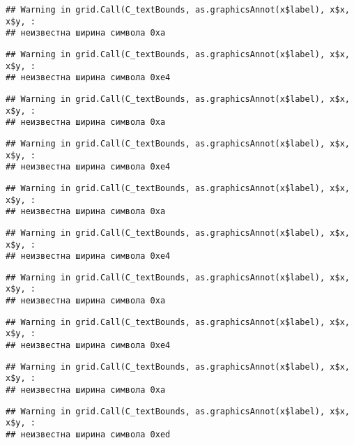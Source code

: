 \documentclass[
]{article}
\begin{document}
\begin{verbatim}
## Warning in grid.Call(C_textBounds, as.graphicsAnnot(x$label), x$x, x$y, :
## неизвестна ширина символа 0xa
\end{verbatim}

\begin{verbatim}
## Warning in grid.Call(C_textBounds, as.graphicsAnnot(x$label), x$x, x$y, :
## неизвестна ширина символа 0xe4
\end{verbatim}

\begin{verbatim}
## Warning in grid.Call(C_textBounds, as.graphicsAnnot(x$label), x$x, x$y, :
## неизвестна ширина символа 0xa
\end{verbatim}

\begin{verbatim}
## Warning in grid.Call(C_textBounds, as.graphicsAnnot(x$label), x$x, x$y, :
## неизвестна ширина символа 0xe4
\end{verbatim}

\begin{verbatim}
## Warning in grid.Call(C_textBounds, as.graphicsAnnot(x$label), x$x, x$y, :
## неизвестна ширина символа 0xa
\end{verbatim}

\begin{verbatim}
## Warning in grid.Call(C_textBounds, as.graphicsAnnot(x$label), x$x, x$y, :
## неизвестна ширина символа 0xe4
\end{verbatim}

\begin{verbatim}
## Warning in grid.Call(C_textBounds, as.graphicsAnnot(x$label), x$x, x$y, :
## неизвестна ширина символа 0xa
\end{verbatim}

\begin{verbatim}
## Warning in grid.Call(C_textBounds, as.graphicsAnnot(x$label), x$x, x$y, :
## неизвестна ширина символа 0xe4
\end{verbatim}

\begin{verbatim}
## Warning in grid.Call(C_textBounds, as.graphicsAnnot(x$label), x$x, x$y, :
## неизвестна ширина символа 0xa
\end{verbatim}

\begin{verbatim}
## Warning in grid.Call(C_textBounds, as.graphicsAnnot(x$label), x$x, x$y, :
## неизвестна ширина символа 0xed
\end{verbatim}
\end{document}
